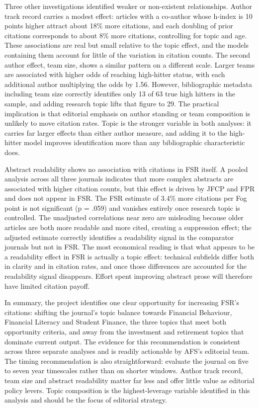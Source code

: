 \documentclass[11pt,a4paper]{article}
\begin{document}
Three other investigations identified weaker or non-existent relationships. Author track record carries a modest effect: articles with a co-author whose h-index is 10 points higher attract about 18\% more citations, and each doubling of prior citations corresponds to about 8\% more citations, controlling for topic and age. These associations are real but small relative to the topic effect, and the models containing them account for little of the variation in citation counts. The second author effect, team size, shows a similar pattern on a different scale. Larger teams are associated with higher odds of reaching high-hitter status, with each additional author multiplying the odds by 1.56. However, bibliographic metadata including team size correctly identifies only 13 of 63 true high hitters in the sample, and adding research topic lifts that figure to 29. The practical implication is that editorial emphasis on author standing or team composition is unlikely to move citation rates. Topic is the stronger variable in both analyses: it carries far larger effects than either author measure, and adding it to the high-hitter model improves identification more than any bibliographic characteristic does.

Abstract readability shows no association with citations in FSR itself. A pooled analysis across all three journals indicates that more complex abstracts are associated with higher citation counts, but this effect is driven by JFCP and FPR and does not appear in FSR. The FSR estimate of 3.4\% more citations per Fog point is not significant (p = .059) and vanishes entirely once research topic is controlled. The unadjusted correlations near zero are misleading because older articles are both more readable and more cited, creating a suppression effect; the adjusted estimate correctly identifies a readability signal in the comparator journals but not in FSR. The most economical reading is that what appears to be a readability effect in FSR is actually a topic effect: technical subfields differ both in clarity and in citation rates, and once those differences are accounted for the readability signal disappears. Effort spent improving abstract prose will therefore have limited citation payoff.

In summary, the project identifies one clear opportunity for increasing FSR's citations: shifting the journal's topic balance towards Financial Behaviour, Financial Literacy and Student Finance, the three topics that meet both opportunity criteria, and away from the investment and retirement topics that dominate current output. The evidence for this recommendation is consistent across three separate analyses and is readily actionable by AFS's editorial team. The timing recommendation is also straightforward: evaluate the journal on five to seven year timescales rather than on shorter windows. Author track record, team size and abstract readability matter far less and offer little value as editorial policy levers. Topic composition is the highest-leverage variable identified in this analysis and should be the focus of editorial strategy.
\end{document}
